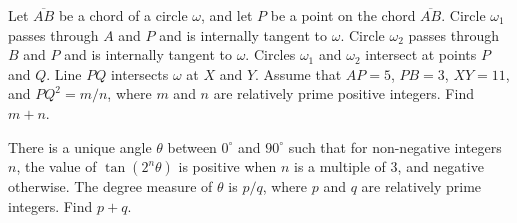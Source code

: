 %	











\begin{question}[name={2019 AIME I, \href{https://artofproblemsolving.com/community/c4p11972613}{Problem 15}}]
	Let $\overline{AB}$ be a chord of a circle $\omega$, and let $P$ be a point on the chord $\overline{AB}$. Circle $\omega_1$ passes through $A$ and $P$ and is internally tangent to $\omega$. Circle $\omega_2$ passes through $B$ and $P$ and is internally tangent to $\omega$. Circles $\omega_1$ and $\omega_2$ intersect at points $P$ and $Q$. Line $PQ$ intersects $\omega$ at $X$ and $Y$. Assume that $AP=5$, $PB=3$, $XY=11$, and $PQ^2 = {m}/{n}$, where $m$ and $n$ are relatively prime positive integers. Find $m+n$.
\end{question}


%	
















\begin{question}[name={2019 AIME II, \href{https://artofproblemsolving.com/community/c4p12030042}{Problem 10}}]
	There is a unique angle $\theta$ between $0^{\circ}$ and $90^{\circ}$ such that for non-negative integers $n$, the value of $\tan{\left(2^{n}\theta\right)}$ is positive when $n$ is a multiple of $3$, and negative otherwise. The degree measure of $\theta$ is ${p}/{q}$, where $p$ and $q$ are relatively prime integers. Find $p+q$.
\end{question}


%	














